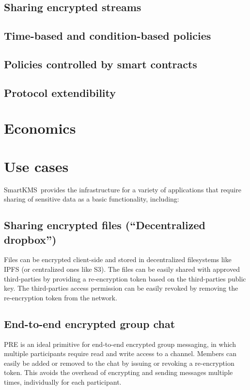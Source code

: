 \documentclass[notitlepage,longbibliography]{revtex4-1}
\newcommand{\kms}{SmartKMS}
\begin{document}
\subsection{Sharing encrypted streams}

\subsection{Time-based and condition-based policies}

\subsection{Policies controlled by smart contracts}

\subsection{Protocol extendibility}

\section{Economics}

\section{Use cases}
\kms~provides the infrastructure for a variety of applications that require sharing of sensitive data as a basic
functionality, including:

\subsection{Sharing encrypted files (``Decentralized dropbox'')}
Files can be encrypted client-side and stored in decentralized filesystems like IPFS (or centralized ones like S3).
The files can be easily shared with approved third-parties by providing a re-encryption token based on the third-parties
public key.
The third-parties access permission can be easily revoked by removing the re-encryption token from the network.

\subsection{End-to-end encrypted group chat}
PRE is an ideal primitive for end-to-end encrypted group messaging, in which multiple participants require read and write
access to a channel. Members can easily be added or removed to the chat by issuing or revoking a re-encryption token.
This avoids the overhead of encrypting and sending messages multiple times, individually for each participant.
\end{document}
